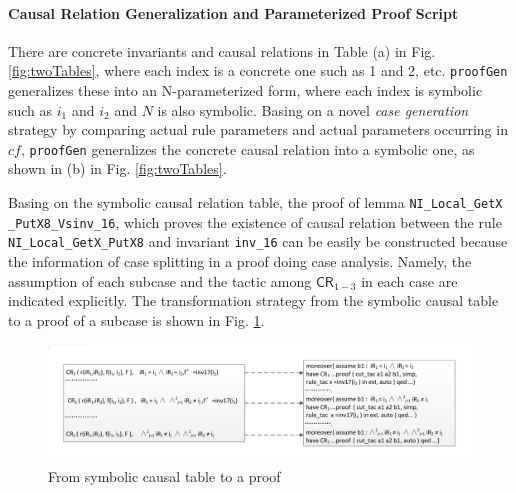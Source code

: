 \documentclass{llncs-new}
\begin{document}
\paragraph{Causal Relation Generalization and Parameterized Proof Script} There are concrete invariants and causal relations in Table (a) in Fig. \ref{fig:twoTables}, where each  index is a concrete one such as 1 and 2, etc. {\tt proofGen} generalizes these into an N-parameterized form, where each index is symbolic such as $i_1$ and $i_2$ and $N$ is also symbolic. Basing on a novel \emph{case generation} strategy by comparing actual rule parameters and actual parameters occurring in $cf$, {\tt proofGen} generalizes the concrete causal relation into a symbolic one, as shown in (b) in Fig. \ref{fig:twoTables}.



Basing on the symbolic causal relation table, the proof of lemma {\tt NI\_Local\_GetX}\\ {\tt\_PutX8\_Vsinv\_16}, which proves the existence of causal relation between the rule {\tt NI\_Local\_GetX\_PutX8} and invariant {\tt inv\_16} can be easily be constructed because the information of case splitting in a proof doing case analysis. Namely, the assumption of each subcase and the tactic among $\mathsf{CR}_{1-3}$ in each case are indicated explicitly.  The transformation strategy from the symbolic causal table to a proof of a subcase is shown in Fig. \ref{fig:tab2Proof}.
\vspace{-30pt}
\begin{figure}[htbp]
\hspace{-30pt}
\includegraphics[width=1.2\textwidth]{tab2Proof.pdf}
\vspace{-30pt}
\caption{From symbolic causal table to a proof \label{fig:tab2Proof}}
\end{figure}
\vspace{-10pt}
\end{document}
